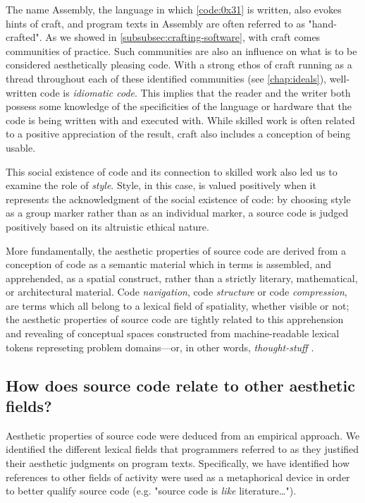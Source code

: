 The name Assembly, the language in which \ref{code:0x31} is written, also evokes hints of craft, and program texts in Assembly are often referred to as "hand-crafted". As we showed in \ref{subsubsec:crafting-software}, with craft comes communities of practice. Such communities are also an influence on what is to be considered aesthetically pleasing code.  With a strong ethos of craft running as a thread throughout each of these identified communities (see \ref{chap:ideals}), well-written code is \emph{idiomatic code}. This implies that the reader and the writer both possess some knowledge of the specificities of the language or hardware that the code is being written with and executed with. While skilled work is often related to a positive appreciation of the result, craft also includes a conception of being usable.

This social existence of code and its connection to skilled work also led us to examine the role of \emph{style}. Style, in this case, is valued positively when it represents the acknowledgment of the social existence of code: by choosing style as a group marker rather than as an individual marker, a source code is judged positively based on its altruistic ethical nature.

More fundamentally, the aesthetic properties of source code are derived from a conception of code as a semantic material which in terms is assembled, and apprehended, as a spatial construct, rather than a strictly literary, mathematical, or architectural material. Code \emph{navigation}, code \emph{structure} or code \emph{compression}, are terms which all belong to a lexical field of spatiality, whether visible or not; the aesthetic properties of source code are tightly related to this apprehension and revealing of conceptual spaces constructed from machine-readable lexical tokens represeting problem domains—or, in other words, \emph{thought-stuff} \citep{brooksjr_mythical_1975}.

\subsection{How does source code relate to other aesthetic fields?}
\label{subsec:conclusion-rq-2}

Aesthetic properties of source code were deduced from an empirical approach. We identified the different lexical fields that programmers referred to as they justified their aesthetic judgments on program texts. Specifically, we have identified how references to other fields of activity were used as a metaphorical device in order to better qualify source code (e.g. "source code is \emph{like} literature\dots").

